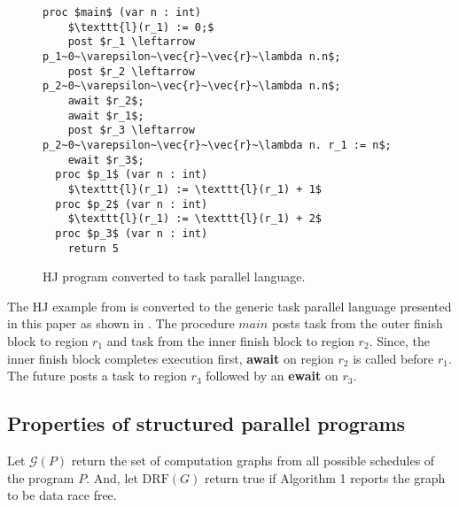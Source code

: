 \begin{figure}
  \begin{center}
    \begin{lstlisting}[mathescape=true]
  proc $main$ (var n : int)
  	$\texttt{l}(r_1) := 0;$
	post $r_1 \leftarrow p_1~0~\varepsilon~\vec{r}~\vec{r}~\lambda n.n$;
	post $r_2 \leftarrow p_2~0~\varepsilon~\vec{r}~\vec{r}~\lambda n.n$;
	await $r_2$;
	await $r_1$;
	post $r_3 \leftarrow p_2~0~\varepsilon~\vec{r}~\vec{r}~\lambda n. r_1 := n$;
	ewait $r_3$;	
  proc $p_1$ (var n : int)
  	$\texttt{l}(r_1) := \texttt{l}(r_1) + 1$
  proc $p_2$ (var n : int)
  	$\texttt{l}(r_1) := \texttt{l}(r_1) + 2$
  proc $p_3$ (var n : int)
  	return 5
\end{lstlisting}
  \end{center}
    \vspace{-2em}
  \caption{HJ program converted to task parallel language.}
        \vspace{-1em}
  \label{fig:hj-async-fin-converted}
\end{figure}

The HJ example from  is converted to the generic task parallel language presented in this paper as shown in . The procedure $main$ posts task from the outer finish block to region $r_1$ and task from the inner finish block to region $r_2$. Since, the inner finish block completes execution first, \textbf{await} on region $r_2$ is called before $r_1$. The future posts a task to region $r_3$ followed by an \textbf{ewait} on $r_3$.

\subsection{Properties of structured parallel programs}

Let $\mathcal{G}( P )$ return the set of computation graphs from all possible schedules of the program $P$. And, let $\mathrm{DRF}( G )$ return true if Algorithm 1 reports the graph to be data race free.

